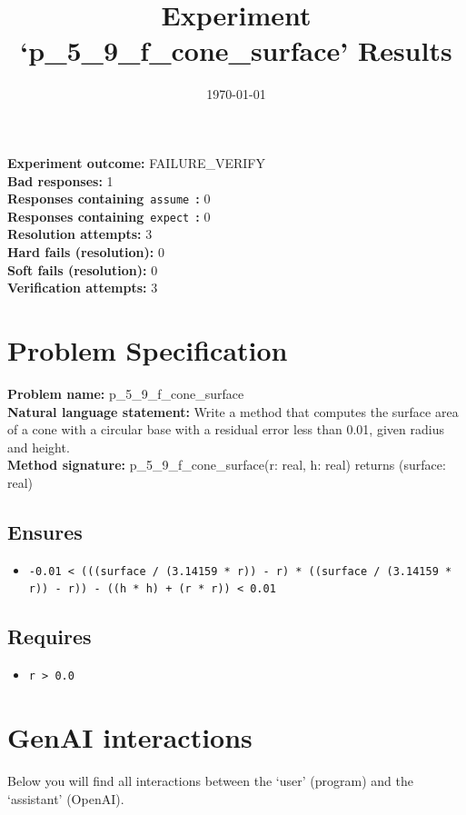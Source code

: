 \documentclass{article}
\begin{document}
\title{Experiment `p\_5\_9\_f\_cone\_surface' Results}
\author{\today}
\date{}
\maketitle
\textbf{Experiment outcome: }FAILURE\_VERIFY
\\\textbf{Bad responses: }1
\\\textbf{Responses containing}~\texttt{assume}~\textbf{: }0
\\\textbf{Responses containing}~\texttt{expect}~\textbf{: }0
\\\textbf{Resolution attempts: }3
\\\textbf{Hard fails (resolution): }0
\\\textbf{Soft fails (resolution): }0
\\\textbf{Verification attempts: }3
\section*{Problem Specification}
\textbf{Problem name: }p\_5\_9\_f\_cone\_surface
\\\textbf{Natural language statement: }Write a method that computes the surface area of a cone with a circular base with a residual error less than 0.01, given radius and height.
\\\textbf{Method signature: }p\_5\_9\_f\_cone\_surface(r: real, h: real) returns (surface: real)
\subsection*{Ensures}
\begin{itemize}
\item \texttt{-0.01 < (((surface / (3.14159 * r)) - r) * ((surface / (3.14159 * r)) - r)) - ((h * h) + (r * r)) < 0.01}
\end{itemize}
\subsection*{Requires}
\begin{itemize}
\item \texttt{r > 0.0}
\end{itemize}
\clearpage
\section*{GenAI interactions}
Below you will find all interactions between the `user' (program) and the `assistant' (OpenAI).
\end{document}
